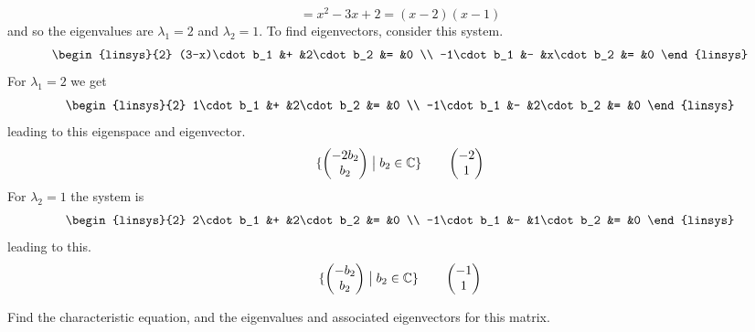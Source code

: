 \begin{exercises}
\begin{answer}
\begin{exparts}
\begin{equation*}
             =x^2-3x+2=(x-2)(x-1)
           \end{equation*}
           and so the eigenvalues are $\lambda_1=2$ and $\lambda_2=1$.
           To find eigenvectors, consider this system.
           \begin{equation*}
             \begin{linsys}{2}
               (3-x)\cdot b_1  &+  &2\cdot b_2  &=  &0  \\
               -1\cdot b_1     &-  &x\cdot b_2  &=  &0
             \end{linsys}
           \end{equation*}
           For $\lambda_1=2$ we get 
           \begin{equation*}
             \begin{linsys}{2}
                1\cdot b_1  &+  &2\cdot b_2  &=  &0  \\
               -1\cdot b_1  &-  &2\cdot b_2  &=  &0
             \end{linsys}
           \end{equation*}
           leading to this eigenspace and eigenvector.
           \begin{equation*}
             \mbox{$\{\begin{pmatrix} -2b_2 \\ b_2 \end{pmatrix}
                   \bigm| b_2\in\mathbb{C}\}$}
             \qquad
             \begin{pmatrix} -2 \\ 1 \end{pmatrix}
           \end{equation*}
           For $\lambda_2=1$ the system is 
           \begin{equation*}
             \begin{linsys}{2}
                2\cdot b_1  &+  &2\cdot b_2  &=  &0  \\
               -1\cdot b_1  &-  &1\cdot b_2  &=  &0
             \end{linsys}
           \end{equation*}
           leading to this.
           \begin{equation*}
             \mbox{$\{\begin{pmatrix} -b_2 \\ b_2 \end{pmatrix}
                   \bigm| b_2\in\mathbb{C}\}$}
             \qquad
             \begin{pmatrix} -1 \\ 1 \end{pmatrix}
           \end{equation*}
       \end{exparts}  
     \end{answer}
  \item
    Find the characteristic equation, and the
    eigenvalues and associated eigenvectors for this matrix.

\end{exercises}
